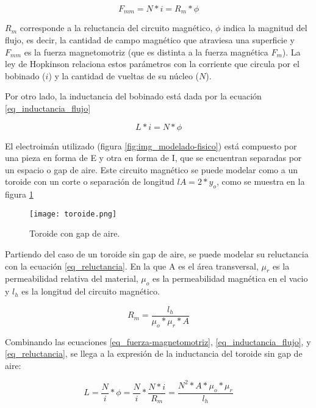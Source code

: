 \begin{equation} \label{eq_fuerza-magnetomotriz}
	F_{mm}=N*i=R_{m}*\phi	
\end{equation}

\noindent $R_{m}$ corresponde a la reluctancia del circuito magnético, $\phi$ indica la magnitud del flujo, es decir, la cantidad de campo magnético que atraviesa una superficie y $F_{mm}$ es la fuerza magnetomotriz (que es distinta a la fuerza magnética $F_{m}$). La ley de Hopkinson relaciona estos parámetros con la corriente que circula por el bobinado ($i$) y la cantidad de vueltas de su núcleo ($N$).


\noindent Por otro lado, la inductancia del bobinado está dada por la ecuación \ref{eq_inductancia_flujo}

\begin{equation} \label{eq_inductancia_flujo}
	L*i=N*\phi
\end{equation}


\noindent El electroimán utilizado (figura \ref{fig:img_modelado-fisico}) está compuesto por una pieza en forma de E y otra en forma de I, que se encuentran separadas por un espacio o gap de aire. Este circuito magnético se puede modelar como a un toroide con un corte o separación  de longitud $lA=2*y_{o}$, como se muestra en la figura \ref{fig:img_toroide}

\begin{figure}[H]
	\centering
	\texttt{[image: toroide.png]}
	\caption{Toroide con gap de aire.}
	\label{fig:img_toroide}
\end{figure}

\noindent Partiendo del caso de un toroide sin gap de aire, se puede modelar su reluctancia con la ecuación \ref{eq_reluctancia}. En la que A es el área transversal, $\mu_{r}$ es la permeabilidad relativa del material, $\mu_{o}$ es la permeabilidad magnética en el vacio y $l_{h}$ es la longitud del circuito magnético. 

\begin{equation}\label{eq_reluctancia}
	R_{m}=\frac{l_{h}}{\mu_{o}*\mu_{r}*A}
\end{equation}

\noindent Combinando las ecuaciones \ref{eq_fuerza-magnetomotriz}, \ref{eq_inductancia_flujo}, y \ref{eq_reluctancia}, se llega a la expresión de la inductancia del toroide sin gap de aire:

\begin{equation}\label{eq_inductancia}
	L=\frac{N}{i}*\phi=\frac{N}{i}*\frac{N*i}{R_{m}}=\frac{N^	{2}*A*\mu_{o}*\mu_{r}}{l_{h}}
\end{equation}


